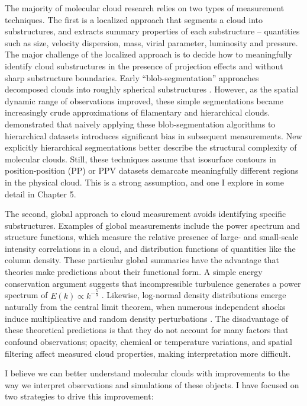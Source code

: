 The majority of molecular cloud research relies on two types of measurement techniques. The first is a localized approach that segments a cloud into substructures, and extracts summary properties of each substructure -- quantities such as size, velocity dispersion, mass, virial parameter, luminosity and pressure. The major challenge of the localized approach is to decide how to meaningfully identify cloud substructures in the presence of projection effects and without sharp substructure boundaries. Early ``blob-segmentation'' approaches decomposed clouds into roughly spherical substructures \citep{Stutzki90, Williams94}. However, as the spatial dynamic range of observations improved, these simple segmentations became increasingly crude approximations of filamentary and hierarchical clouds. \cite{Pineda09} demonstrated that naively applying these blob-segmentation algorithms to hierarchical datasets introduces significant bias in subsequent measurements. New explicitly hierarchical segmentations \citep{Rosolowsky08} better describe the structural complexity of molecular clouds. Still, these techniques assume that isosurface contours in position-position (PP) or PPV datasets demarcate meaningfully different regions in the physical cloud. This is a strong assumption, and one I explore in some detail in Chapter 5.

The second, global approach to cloud measurement avoids identifying specific substructures. Examples of global measurements include the power spectrum and structure functions, which measure the relative presence of large- and small-scale intensity correlations in a cloud, and distribution functions of quantities like the column density. These particular global summaries have the advantage that theories make predictions about their functional form. A simple energy conservation argument suggests that incompressible turbulence generates a power spectrum of $E(k) \propto k^{-\frac{5}{3}}$  \citep{Elmegreen04}. Likewise, log-normal density distributions emerge naturally from the central limit theorem, when numerous independent shocks induce multiplicative and random density perturbations \citep{Vaz01}. The disadvantage of these theoretical predictions is that they do not account for many factors that confound observations; opacity, chemical or temperature variations, and spatial filtering affect measured cloud properties, making interpretation more difficult.

I believe we can better understand molecular clouds with improvements to the way we interpret observations and simulations of these objects. I have focused on two strategies to drive this improvement:

